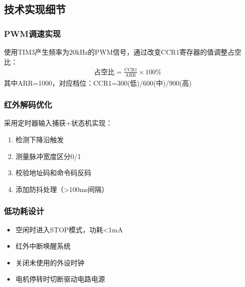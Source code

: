 \subsection{技术实现细节}
\subsubsection{PWM调速实现}
使用TIM3产生频率为20kHz的PWM信号，通过改变CCR1寄存器的值调整占空比：
\begin{align*}
\text{占空比} = \frac{\text{CCR1}}{\text{ARR}} \times 100\%
\end{align*}
其中ARR=1000，对应档位：CCR1=300(低)/600(中)/900(高)

\subsubsection{红外解码优化}
采用定时器输入捕获+状态机实现：
\begin{enumerate}
    \item 检测下降沿触发
    \item 测量脉冲宽度区分0/1
    \item 校验地址码和命令码反码
    \item 添加防抖处理（>100ms间隔）
\end{enumerate}

\subsubsection{低功耗设计}
\begin{itemize}
    \item 空闲时进入STOP模式，功耗<1mA
    \item 红外中断唤醒系统
    \item 关闭未使用的外设时钟
    \item 电机停转时切断驱动电路电源
\end{itemize}
